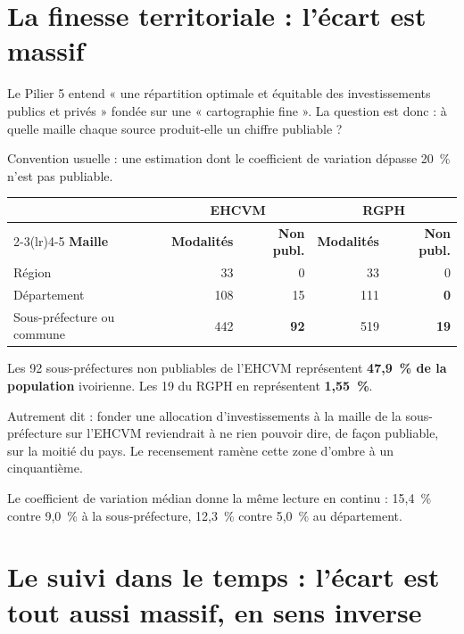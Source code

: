 \documentclass[11pt,a4paper]{article}
\begin{document}
\section{La finesse territoriale : l'écart est massif}

Le Pilier 5 entend « une répartition optimale et équitable des investissements publics et privés »
fondée sur une « cartographie fine ». La question est donc : à quelle maille chaque source
produit-elle un chiffre publiable ?

Convention usuelle : une estimation dont le coefficient de variation dépasse 20~\% n'est pas
publiable.

\begin{center}
\begin{tabular}{@{}lrrrr@{}}
\toprule
& \multicolumn{2}{c}{\textbf{EHCVM}} & \multicolumn{2}{c}{\textbf{RGPH}} \\
\cmidrule(lr){2-3}\cmidrule(lr){4-5}
\textbf{Maille} & \textbf{Modalités} & \textbf{Non publ.} & \textbf{Modalités} &
  \textbf{Non publ.} \\
\midrule
Région & 33 & 0 & 33 & 0 \\
Département & 108 & 15 & 111 & \textbf{0} \\
Sous-préfecture ou commune & 442 & \textbf{92} & 519 & \textbf{19} \\
\bottomrule
\end{tabular}
\end{center}

\begin{attention}
Les 92 sous-préfectures non publiables de l'EHCVM représentent \textbf{47,9~\% de la population}
ivoirienne. Les 19 du RGPH en représentent \textbf{1,55~\%}.

Autrement dit : fonder une allocation d'investissements à la maille de la sous-préfecture sur
l'EHCVM reviendrait à ne rien pouvoir dire, de façon publiable, sur la moitié du pays. Le
recensement ramène cette zone d'ombre à un cinquantième.
\end{attention}

Le coefficient de variation médian donne la même lecture en continu : 15,4~\% contre 9,0~\% à la
sous-préfecture, 12,3~\% contre 5,0~\% au département.

\section{Le suivi dans le temps : l'écart est tout aussi massif, en sens inverse}
\end{document}
